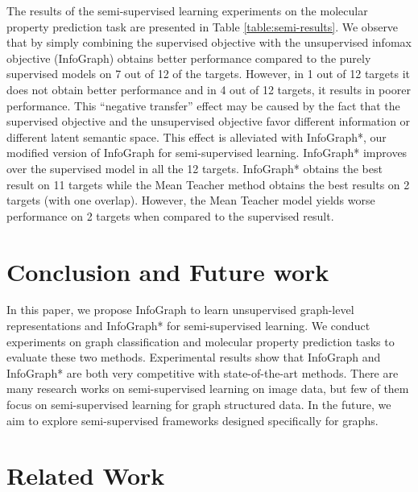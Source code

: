 \documentclass{article} \usepackage{iclr2020_conference,times}
\def\method{InfoGraph}
\begin{document}
The results of the semi-supervised learning experiments on the molecular property prediction task are presented in Table \ref{table:semi-results}. We observe that by simply combining the supervised objective with the unsupervised infomax objective (\method{}) obtains better performance compared to the purely supervised models on 7 out of 12 of the targets. However, in 1 out of 12 targets it does not obtain better performance and in 4 out of 12 targets, it results in poorer performance. This ``negative transfer'' effect may be caused by the fact that the supervised objective and the unsupervised objective favor different information or different latent semantic space. 
This effect is alleviated with \method{}*, our modified version of \method{} for semi-supervised learning.
\method{}* improves over the supervised model in all the 12 targets. \method{}* obtains the best result on 11 targets while the Mean Teacher method obtains the best results on 2 targets (with one overlap). However, the Mean Teacher model yields worse performance on 2 targets when compared to the supervised result. 


\section{Conclusion and Future work}
In this paper, we propose \method{} to learn unsupervised graph-level representations and \method{}* for semi-supervised learning. We conduct experiments on graph classification and molecular property prediction tasks to evaluate these two methods. Experimental results show that \method{} and \method{}* are both very competitive with state-of-the-art methods. There are many research works on semi-supervised learning on image data, but few of them focus on semi-supervised learning for graph structured data. In the future, we aim to explore semi-supervised frameworks designed specifically for graphs.






\newpage
\appendix
\section{Related Work}
\end{document}
